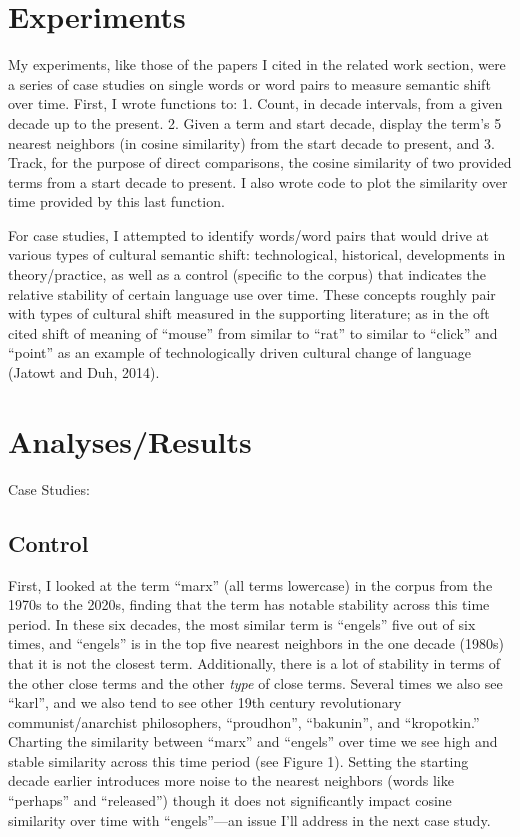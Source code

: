 \documentclass[11pt]{article}
\begin{document}
\section{Experiments}


My experiments, like those of the papers I cited in the related work section, were a series of case studies on single words or word pairs to measure semantic shift over time. First, I wrote functions to: 1. Count, in decade intervals, from a given decade up to the present. 2. Given a term and start decade, display the term’s 5 nearest neighbors (in cosine similarity) from the start decade to present, and 3. Track, for the purpose of direct comparisons, the cosine similarity of two provided terms from a start decade to present. I also wrote code to plot the similarity over time provided by this last function. 

For case studies, I attempted to identify words/word pairs that would drive at various types of cultural semantic shift: technological, historical, developments in theory/practice, as well as a control (specific to the corpus) that indicates the relative stability of certain language use over time. These concepts roughly pair with types of cultural shift measured in the supporting literature; as in the oft cited shift of meaning of “mouse” from similar to “rat” to similar to “click” and “point” as an example of technologically driven cultural change of language (Jatowt and Duh, 2014).


\section{
Analyses/Results
}
Case Studies:

\subsection{Control
}



First, I looked at the term “marx” (all terms lowercase) in the corpus from the 1970s to the 2020s, finding that the term has notable stability across this time period. In these six decades, the most similar term is “engels” five out of six times, and “engels” is in the top five nearest neighbors in the one decade (1980s) that it is not the closest term. Additionally, there is a lot of stability in terms of the other close terms and the other \textit{type} of close terms. Several times we also see “karl”, and we also tend to see other 19th century revolutionary communist/anarchist philosophers, “proudhon”, “bakunin”, and “kropotkin.” Charting the similarity between “marx” and “engels” over time we see high and stable similarity across this time period (see Figure 1). Setting the starting decade earlier introduces more noise to the nearest neighbors (words like “perhaps” and “released”) though it does not significantly impact cosine similarity over time with “engels”—an issue I’ll address in the next case study.
\end{document}
